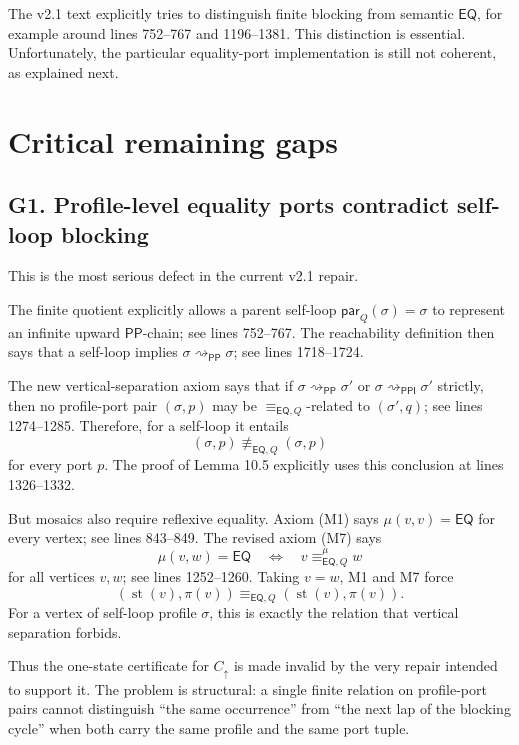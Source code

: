 \documentclass[11pt]{article}
\newcommand{\PP}{\mathsf{PP}}
\newcommand{\PPI}{\mathsf{PPI}}
\newcommand{\EQ}{\mathsf{EQ}}
\newcommand{\st}{\operatorname{st}}
\newcommand{\parQ}{\mathsf{par}_Q}
\newcommand{\eqQ}{\equiv_{\EQ,Q}}
\newcommand{\reach}{\rightsquigarrow}
\begin{document}
The v2.1 text explicitly tries to distinguish finite blocking from semantic
\(\EQ\), for example around lines 752--767 and 1196--1381.  This distinction is
essential.  Unfortunately, the particular equality-port implementation is still
not coherent, as explained next.

\section{Critical remaining gaps}

\subsection{G1. Profile-level equality ports contradict self-loop blocking}

This is the most serious defect in the current v2.1 repair.

The finite quotient explicitly allows a parent self-loop
\(\parQ(\sigma)=\sigma\) to represent an infinite upward \(\PP\)-chain; see
lines 752--767.  The reachability definition then says that a self-loop implies
\(\sigma\reach_{\PP}\sigma\); see lines 1718--1724.

The new vertical-separation axiom says that if \(\sigma\reach_{\PP}\sigma'\) or
\(\sigma\reach_{\PPI}\sigma'\) strictly, then no profile-port pair
\((\sigma,p)\) may be \(\eqQ\)-related to \((\sigma',q)\); see lines
1274--1285.  Therefore, for a self-loop it entails
\[
(\sigma,p)\not\eqQ(\sigma,p)
\]
for every port \(p\).  The proof of Lemma 10.5 explicitly uses this conclusion
at lines 1326--1332.

But mosaics also require reflexive equality.  Axiom (M1) says
\(\mu(v,v)=\EQ\) for every vertex; see lines 843--849.  The revised axiom (M7)
says
\[
\mu(v,w)=\EQ \quad\Longleftrightarrow\quad v\eqQ^\mu w
\]
for all vertices \(v,w\); see lines 1252--1260.  Taking \(v=w\), M1 and M7
force
\[
(\st(v),\pi(v))\eqQ(\st(v),\pi(v)).
\]
For a vertex of self-loop profile \(\sigma\), this is exactly the relation
that vertical separation forbids.

Thus the one-state certificate for \(C_\uparrow\) is made invalid by the very
repair intended to support it.  The problem is structural: a single finite
relation on profile-port pairs cannot distinguish ``the same occurrence'' from
``the next lap of the blocking cycle'' when both carry the same profile and the
same port tuple.
\end{document}
